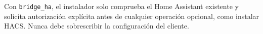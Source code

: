 \begin{tcolorbox}[title=Regla de preservación]
Con \texttt{bridge\_ha}, el instalador solo comprueba el Home Assistant existente y solicita autorización explícita antes de cualquier operación opcional, como instalar HACS. Nunca debe sobrescribir la configuración del cliente.
\end{tcolorbox}
